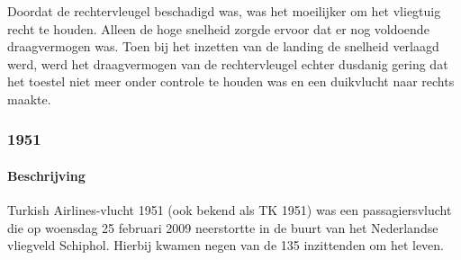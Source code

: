 \documentclass{article}
\begin{document}
	Doordat de rechtervleugel beschadigd was, was het moeilijker om het vliegtuig recht te houden. Alleen de hoge snelheid zorgde ervoor dat er nog voldoende draagvermogen was. Toen bij het inzetten van de landing de snelheid verlaagd werd, werd het draagvermogen van de rechtervleugel echter dusdanig gering dat het toestel niet meer onder controle te houden was en een duikvlucht naar rechts maakte.
	\cite{aviationsafety04101992airplaneCrashBijlmer}
	\cite{catsr25022009Boeing737AmsterdamCrash}
	\cite{BijlmerrampWiki}
	\cite{ElAlFlight1862}
	\cite{bijlmerReconstruction}
	\cite{bijlmer5}
	\cite{dataReconstruct}
	\cite{dataReconstructBijlmermeerairplane1992}
	\cite{dataReconstructBijlmermeerairplane}
	\cite{dataReconstructBijlmermeerairplaneSimul}
	\cite{smailiDataReconstruction}
	\cite{smailiDataReconstructionBijlmer}
	\cite{pilotedSimulator}
	\cite{accidentReport}
	\subsubsection{1951}
	\paragraph{Beschrijving}
	Turkish Airlines-vlucht 1951 (ook bekend als TK 1951) was een passagiersvlucht die op woensdag 25 februari 2009 neerstortte in de buurt van het Nederlandse vliegveld Schiphol. Hierbij kwamen negen van de 135 inzittenden om het leven.
	
\end{document}

